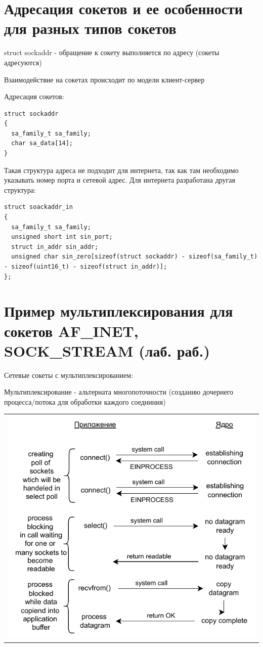 \section{Адресация сокетов и ее особенности для разных типов сокетов}

struct sockaddr - обращение к сокету выполняется по адресу (сокеты адресуются)

Взаимодействие на сокетах происходит по модели клиент-сервер

Адресация сокетов:
\begin{lstlisting}
struct sockaddr
{
  sa_family_t sa_family;
  char sa_data[14]; 
}
\end{lstlisting}
Такая структура адреса не подходит для интернета, так как там необходимо указывать номер порта и сетевой адрес. Для интернета разработана другая структура:

\begin{lstlisting}
struct soackaddr_in
{
  sa_family_t sa_family;
  unsigned short int sin_port;
  struct in_addr sin_addr;
  unsigned char sin_zero[sizeof(struct sockaddr) - sizeof(sa_family_t) - sizeof(uint16_t) - sizeof(struct in_addr)];
};
\end{lstlisting}

\section{Пример мультиплексирования для сокетов  AF\_INET, SOCK\_STREAM (лаб. раб.)}

Сетевые сокеты с мультиплексированием:

Мультиплексирование - альтерната многопоточности (созданию дочернего процесса/потока для обработки каждого соедниния)

\begin{table}[H]
  \centering
  \begin{tabular}{p{1\linewidth}}
    \centering
    \includegraphics[width=0.8\linewidth]{./images/7-2.pdf}
  \end{tabular}
\end{table}

